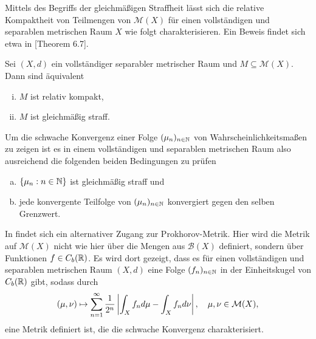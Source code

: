 Mittels des Begriffs der gleichmäßigen Straffheit lässt sich die relative Kompaktheit von Teilmengen von $\mathcal{M}(X)$ für einen vollständigen und separablen metrischen Raum $X$ wie folgt charakterisieren. Ein Beweis findet sich etwa in \cite{parthasarathy}[Theorem 6.7]. 

\begin{theorem}
    Sei $(X,d)$ ein vollständiger separabler metrischer Raum und $M \subseteq \mathcal{M}(X)$. Dann sind äquivalent
    \begin{enumerate}[(i)]
        \item $M$ ist relativ kompakt,
        \item $M$ ist gleichmäßig straff. 
    \end{enumerate}
\end{theorem}

Um die schwache Konvergenz einer Folge $(\mu_n)_{n \in \mathbb{N}}$ von Wahrscheinlichkeitsmaßen zu zeigen ist es in einem vollständigen und separablen metrischen Raum also ausreichend die folgenden beiden Bedingungen zu prüfen
\begin{enumerate}[(a)]
    \item $\{\mu_n: n \in \mathbb{N}\}$ ist gleichmäßig straff und
    \item jede konvergente Teilfolge von $(\mu_n)_{n \in \mathbb{N}}$ konvergiert gegen den selben Grenzwert.
\end{enumerate}

\begin{remark}
    In \cite{li-queffelec} findet sich ein alternativer Zugang zur Prokhorov-Metrik. Hier wird die Metrik auf $\mathcal{M}(X)$ nicht wie hier über die Mengen aus $\mathcal{B}(X)$ definiert, sondern über Funktionen $f \in C_b(\mathbb{R})$.
    Es wird dort gezeigt, dass es für einen vollständigen und separablen metrischen Raum $(X,d)$ eine Folge $(f_n)_{n \in \mathbb{N}}$ in der Einheitskugel von $C_b(\mathbb{R})$ gibt, sodass durch
    $$
        (\mu, \nu) \mapsto \sum_{n=1}^{\infty}\frac{1}{2^n}\left| \int_Xf_nd\mu - \int_X f_n d\nu \right|, \quad \mu, \nu \in \mathcal{M}(X),
    $$
    eine Metrik definiert ist, die die schwache Konvergenz charakterisiert. 
\end{remark}
